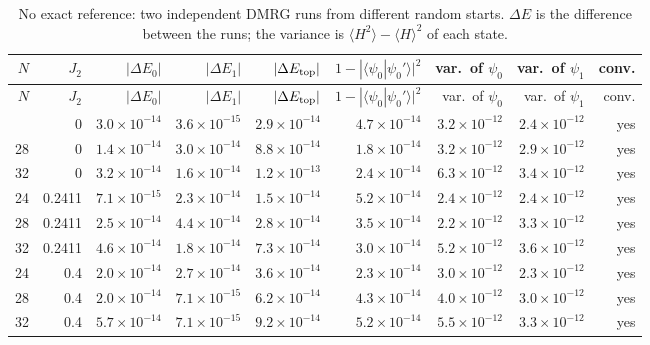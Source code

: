 \documentclass[11pt]{article}
\begin{document}
{\small
\begin{longtable}{rrrrrrrrr}
\caption{No exact reference: two independent DMRG runs from different random starts. $\Delta E$ is the difference between the runs; the variance is $\langle H^2\rangle-\langle H\rangle^2$ of each state.}\label{tab:cons}\\
\toprule
$N$ & $J_2$ & $|\Delta E_0|$ & $|\Delta E_1|$ & $|\Delta E_{\rm top}|$ & $1-|\langle\psi_0|\psi_0'\rangle|^2$ & var.\ of $\psi_0$ & var.\ of $\psi_1$ & conv. \\
\midrule
\endfirsthead
\toprule
$N$ & $J_2$ & $|\Delta E_0|$ & $|\Delta E_1|$ & $|\Delta E_{\rm top}|$ & $1-|\langle\psi_0|\psi_0'\rangle|^2$ & var.\ of $\psi_0$ & var.\ of $\psi_1$ & conv. \\
\midrule
\endhead
\bottomrule
\endfoot
24 & 0 & $3.0\times10^{-14}$ & $3.6\times10^{-15}$ & $2.9\times10^{-14}$ & $4.7\times10^{-14}$ & $3.2\times10^{-12}$ & $2.4\times10^{-12}$ & yes \\
28 & 0 & $1.4\times10^{-14}$ & $3.0\times10^{-14}$ & $8.8\times10^{-14}$ & $1.8\times10^{-14}$ & $3.2\times10^{-12}$ & $2.9\times10^{-12}$ & yes \\
32 & 0 & $3.2\times10^{-14}$ & $1.6\times10^{-14}$ & $1.2\times10^{-13}$ & $2.4\times10^{-14}$ & $6.3\times10^{-12}$ & $3.4\times10^{-12}$ & yes \\
24 & 0.2411 & $7.1\times10^{-15}$ & $2.3\times10^{-14}$ & $1.5\times10^{-14}$ & $5.2\times10^{-14}$ & $2.4\times10^{-12}$ & $2.4\times10^{-12}$ & yes \\
28 & 0.2411 & $2.5\times10^{-14}$ & $4.4\times10^{-14}$ & $2.8\times10^{-14}$ & $3.5\times10^{-14}$ & $2.2\times10^{-12}$ & $3.3\times10^{-12}$ & yes \\
32 & 0.2411 & $4.6\times10^{-14}$ & $1.8\times10^{-14}$ & $7.3\times10^{-14}$ & $3.0\times10^{-14}$ & $5.2\times10^{-12}$ & $3.6\times10^{-12}$ & yes \\
24 & 0.4 & $2.0\times10^{-14}$ & $2.7\times10^{-14}$ & $3.6\times10^{-14}$ & $2.3\times10^{-14}$ & $3.0\times10^{-12}$ & $2.3\times10^{-12}$ & yes \\
28 & 0.4 & $2.0\times10^{-14}$ & $7.1\times10^{-15}$ & $6.2\times10^{-14}$ & $4.3\times10^{-14}$ & $4.0\times10^{-12}$ & $3.0\times10^{-12}$ & yes \\
32 & 0.4 & $5.7\times10^{-14}$ & $7.1\times10^{-15}$ & $9.2\times10^{-14}$ & $5.2\times10^{-14}$ & $5.5\times10^{-12}$ & $3.3\times10^{-12}$ & yes \\
\end{longtable}
}
\end{document}

